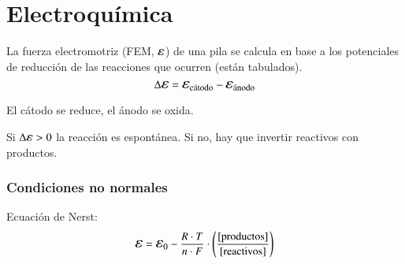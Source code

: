 \section{Electroquímica}

La fuerza electromotriz (FEM, $\bigepsilon$) de una pila se calcula en base a los potenciales de reducción de las reacciones que ocurren (están tabulados).
$$\Delta\bigepsilon = \bigepsilon_{\text{cátodo}} - \bigepsilon_{\text{ánodo}}$$

El cátodo se reduce, el ánodo se oxida.

Si $\Delta\bigepsilon>0$ la reacción es espontánea. Si no, hay que invertir reactivos con productos.

\subsubsection*{Condiciones no normales}

Ecuación de Nerst: 
$$\bigepsilon = \bigepsilon_0  - \dfrac{R\cdot T}{n \cdot F} \cdot \left( \dfrac{[\text{productos}]}{[\text{reactivos}]} \right)$$
